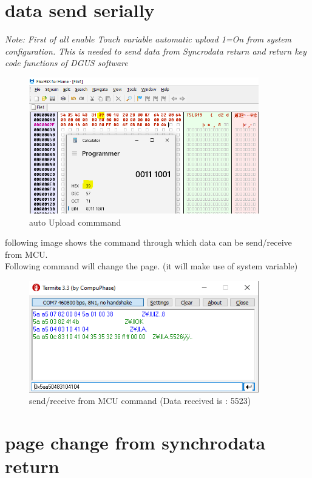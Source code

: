 \documentclass[12pt, A4]{article} %
\begin{document}
\newpage


\section{data send serially}

\emph{Note: First of all enable Touch variable automatic upload 1=On from system configuration. This is needed to send data from Syncrodata return and return key code functions of DGUS software}

\begin{figure}[!htb] %
	\centering
	\includegraphics[width=10cm]{autoupload} 
	\caption{auto Upload commmand}
\end{figure}

following image shows the command through which data can be send/receive from MCU. 
\\ Following command will change the page. (it will make use of system variable)


\begin{figure}[!htb] %
	\centering
	\includegraphics[width=10cm]{receive} 
	\caption{send/receive from MCU command (Data received is : 5523)}
\end{figure}

\newpage


\section{page change from synchrodata return}
\end{document}
